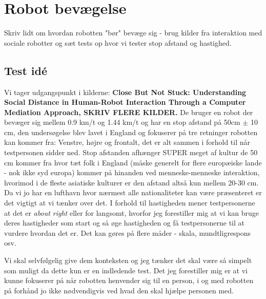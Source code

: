 \chapter{Robot bevægelse}
\label{RobotBevaegelse}
%
Skriv lidt om hvordan robotten "bør" bevæge sig - brug kilder fra interaktion med sociale robotter og sæt tests op hvor vi tester stop afstand og hastighed. \blankline
%
\section{Test idé}
%
Vi tager udgangspunkt i kilderne:\textbf{ Close But Not Stuck:
Understanding Social Distance in Human-Robot Interaction Through a Computer Mediation Approach, SKRIV FLERE KILDER.} De bruger en robot der bevæger sig mellem 0.9 km/t og 1.44 km/t og har en stop afstand på 50cm $\pm$ 10 cm, den undersøgelse blev lavet i England og fokuserer på tre retninger robotten kan kommer fra: Venstre, højre og frontalt, det er alt sammen i forhold til når testpersonen sidder ned. Stop afstanden afhænger SUPER meget af kultur de 50 cm kommer fra hvor tæt folk i England (måske generelt for flere europæiske lande - nok ikke syd europa) kommer på hinanden ved menneske-menneske interaktion, hvorimod i de fleste asiatiske kulturer er den afstand altså kun mellem 20-30 cm. Da vi jo har en lufthavn hvor nærmest alle nationaliteter kan være præsenteret er det vigtigt at vi tænker over det. I forhold til hastigheden mener testpersonerne at det er \textit{about right} eller for langsomt, hvorfor jeg forestiller mig at vi kan bruge deres hastigheder som start og så øge hastigheden og få testpersonerne til at vurdere hvordan det er. Det kan gøres på flere måder - skala, mundtligrespons osv. 

Vi skal selvfølgelig give dem konteksten og jeg tænker det skal være så simpelt som muligt da dette kun er en indledende test. Det jeg forestiller mig er at vi kunne fokuserer på når robotten henvender sig til en person, i og med robotten på forhånd jo ikke nødvendigvis ved hvad den skal hjælpe personen med. 

